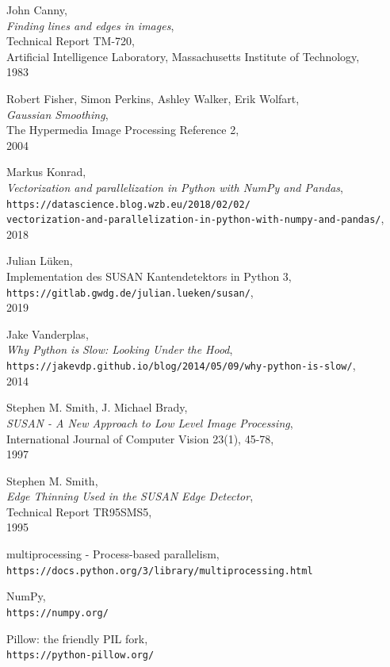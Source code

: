 \documentclass[a4paper, 11pt]{report}
\renewcommand{\emph}[1]{\textit{#1}}
\theoremstyle{definition}
\begin{document}
\begin{thebibliography}{56}
	John Canny,\\
	\emph{Finding lines and edges in images},\\
	Technical Report TM-720,\\
	Artificial Intelligence Laboratory, Massachusetts Institute of Technology,\\
	1983

	Robert Fisher, Simon Perkins, Ashley Walker, Erik Wolfart,\\
	\textit{Gaussian Smoothing},\\
	The Hypermedia Image Processing Reference 2,\\
	2004

	Markus Konrad,\\
	\textit{Vectorization and parallelization in Python with NumPy and Pandas},\\
	\texttt{https://datascience.blog.wzb.eu/2018/02/02/\\
	vectorization-and-parallelization-in-python-with-numpy-and-pandas/},\\
	2018

	Julian Lüken,\\
	Implementation des SUSAN Kantendetektors in Python 3,\\
	\texttt{https://gitlab.gwdg.de/julian.lueken/susan/},\\
	2019

	Jake Vanderplas,\\
	\textit{Why Python is Slow: Looking Under the Hood},\\
	\texttt{https://jakevdp.github.io/blog/2014/05/09/why-python-is-slow/},\\
	2014

	Stephen M. Smith, J. Michael Brady,\\
	\textit{SUSAN - A New Approach to Low Level Image Processing},\\
	International Journal of Computer Vision 23(1), 45-78,\\
	1997

	Stephen M. Smith,\\
	\textit{Edge Thinning Used in the SUSAN Edge Detector},\\
	Technical Report TR95SMS5,\\
	1995
	
	multiprocessing - Process-based parallelism, \\
	\texttt{https://docs.python.org/3/library/multiprocessing.html}

	NumPy,\\
	\texttt{https://numpy.org/}

	Pillow: the friendly PIL fork, \\
	\texttt{https://python-pillow.org/}

\end{thebibliography}
\pagebreak
\end{document}
